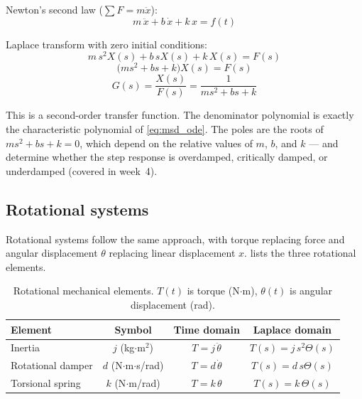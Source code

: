 \documentclass[12pt]{article}
\begin{document}
Newton's second law ($\sum F = m\ddot{x}$):
\begin{equation}
  m \, \ddot{x} + b \, \dot{x} + k \, x = f(t)
  \label{eq:msd_ode}
\end{equation}

Laplace transform with zero initial conditions:
\[
  m \, s^2 X(s) + b \, s X(s) + k \, X(s) = F(s)
\]
\[
  \bigl(m s^2 + b s + k\bigr)X(s) = F(s)
\]
\begin{equation}
  G(s) = \frac{X(s)}{F(s)} = \frac{1}{m s^2 + b s + k}
  \label{eq:msd_tf}
\end{equation}

This is a second-order transfer function.  The denominator polynomial is
exactly the characteristic polynomial of \cref{eq:msd_ode}.  The poles are
the roots of $m s^2 + b s + k = 0$, which depend on the relative values of
$m$, $b$, and $k$ --- and determine whether the step response is overdamped,
critically damped, or underdamped (covered in week~4).

\subsection{Rotational systems}
\label{sec:rotation}

Rotational systems follow the same approach, with torque replacing force and
angular displacement $\theta$ replacing linear displacement $x$.
 lists the three rotational elements.

\begin{table}[htbp]
\centering
\caption{Rotational mechanical elements.  $T(t)$ is torque (N$\cdot$m),
  $\theta(t)$ is angular displacement (rad).}
\label{tab:rotational}
\begin{tabular}{lccc}
\toprule
Element & Symbol & Time domain & Laplace domain \\
\midrule
Inertia          & $j$ (kg$\cdot$m$^2$) & $T = j\,\ddot{\theta}$  & $T(s) = j\,s^2\Theta(s)$ \\[4pt]
Rotational damper & $d$ (N$\cdot$m$\cdot$s/rad) & $T = d\,\dot{\theta}$ & $T(s) = d\,s\Theta(s)$ \\[4pt]
Torsional spring  & $k$ (N$\cdot$m/rad) & $T = k\,\theta$ & $T(s) = k\,\Theta(s)$ \\[4pt]
\bottomrule
\end{tabular}
\end{table}
\end{document}
